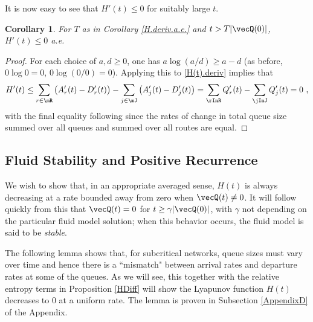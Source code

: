 \documentclass{amsart}
\newtheorem{corollary}{Corollary}
\begin{document}
It is now easy to see that $H'(t)\le 0$ for suitably large $t$.
\begin{corollary}\label{cor:H.non-increasing}
For $T$ as in Corollary \ref{H.deriv.a.e.} and $t>T|\vecQ(0)|$, $H'(t) \le 0$ a.e.
\end{corollary}
\begin{proof}
For each choice of $a,\! d\geq0$, one has  $a \log (a/d) \geq a-d$ (as before,
 $0\log 0 = 0$,  $0\log (0/0)= 0$). Applying this to \eqref{H(t).deriv} implies that
\begin{equation}\label{eq:cons.flow}
H'(t) \leq  \sum_{r\in\mR} \big( A'_r(t) - D'_r(t) \big) -  \sum_{j\in\mJ} \big( A'_j(t) - D'_j(t) \big)
=\sum_\rInR Q'_r(t)
- \sum_\jInJ Q'_j(t) = 0 \ ,
\end{equation}
with the final equality following since 
the rates of change in total queue size summed over all queues and summed over all routes are equal.
\end{proof}

\subsection{Fluid Stability and Positive Recurrence}\label{PosRec}

We wish to show that, in an appropriate averaged sense, $H(t)$ is always decreasing at a rate bounded away from zero when $\vecQ(t)\not=0$.  It will follow quickly from this that $\vecQ(t) = 0$ for $t\ge \gamma |\vecQ(0)|$, with $\gamma$
not depending on the particular fluid model solution; when this behavior occurs, the fluid
model is said to be \emph{stable}.

The following lemma shows that, for subcritical networks, queue sizes must vary over time and hence there is a ``mismatch" between arrival rates and departure rates at some of the queues. As we will see, this together with the relative entropy terms in Proposition \ref{HDiff} will show the Lyapunov function $H(t)$ decreases to $0$ at a uniform rate.
The lemma is proven in Subsection \ref{AppendixD} of the Appendix.  
\end{document}
